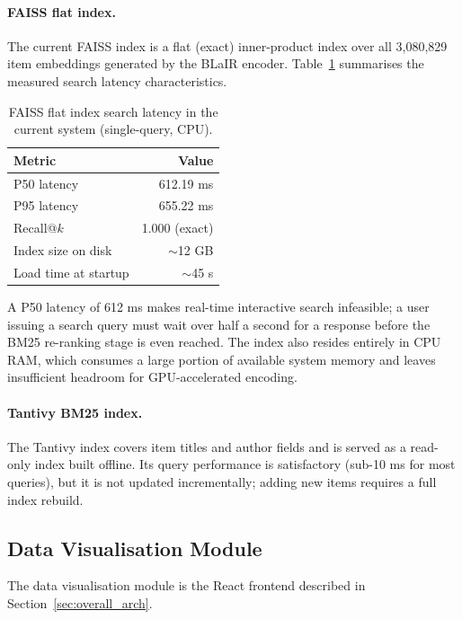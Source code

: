 \paragraph{FAISS flat index.}
The current FAISS index is a flat (exact) inner-product index over all 3{,}080{,}829 item embeddings generated by the BLaIR encoder.
Table~\ref{tab:prior_faiss_latency} summarises the measured search latency characteristics.

\begin{table}[H]
\centering
\caption{FAISS flat index search latency in the current system (single-query, CPU).}
\label{tab:prior_faiss_latency}
\begin{tabular}{lr}
\hline
\textbf{Metric} & \textbf{Value} \\
\hline
P50 latency & 612.19 ms \\
P95 latency & 655.22 ms \\
Recall@$k$ & 1.000 (exact) \\
Index size on disk & $\sim$12 GB \\
Load time at startup & $\sim$45 s \\
\hline
\end{tabular}
\end{table}

A P50 latency of 612 ms makes real-time interactive search infeasible; a user issuing a search query must wait over half a second for a response before the BM25 re-ranking stage is even reached.
The index also resides entirely in CPU RAM, which consumes a large portion of available system memory and leaves insufficient headroom for GPU-accelerated encoding.

\paragraph{Tantivy BM25 index.}
The Tantivy index covers item titles and author fields and is served as a read-only index built offline.
Its query performance is satisfactory (sub-10 ms for most queries), but it is not updated incrementally; adding new items requires a full index rebuild.

\subsection{Data Visualisation Module}
\label{sec:viz_analysis}

The data visualisation module is the React frontend described in Section~\ref{sec:overall_arch}.

